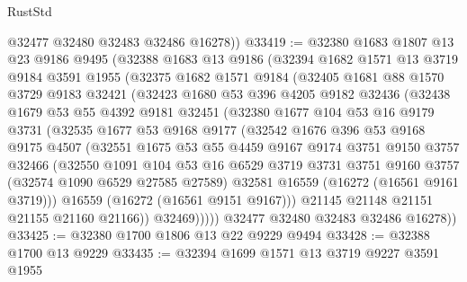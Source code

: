 \begin{lexlean}{RustStd}
\begin{coremodule}
        @32477
        @32480
        @32483
        @32486
        @16278))
@33419 := @32380
    @1683
    @1807
    @13
    @23
    @9186
    @9495
    (@32388
      @1683
      @13
      @9186
      (@32394
        @1682
        @1571
        @13
        @3719
        @9184
        @3591
        @1955
        (@32375
          @1682
          @1571
          @9184
          (@32405
            @1681
            @88
            @1570
            @3729
            @9183
            @32421
            (@32423
              @1680
              @53
              @396
              @4205
              @9182
              @32436
              (@32438
                @1679
                @53
                @55
                @4392
                @9181
                @32451
                (@32380
                  @1677
                  @104
                  @53
                  @16
                  @9179
                  @3731
                  (@32535
                    @1677
                    @53
                    @9168
                    @9177
                    (@32542
                      @1676
                      @396
                      @53
                      @9168
                      @9175
                      @4507
                      (@32551
                        @1675
                        @53
                        @55
                        @4459
                        @9167
                        @9174
                        @3751
                        @9150
                        @3757
                        @32466
                        (@32550
                          @1091
                          @104
                          @53
                          @16
                          @6529
                          @3719
                          @3731
                          @3751
                          @9160
                          @3757
                          (@32574 @1090 @6529 @27585 @27589)
                          @32581
                          @16559
                          (@16272 (@16561 @9161 @3719)))
                        @16559
                        (@16272 (@16561 @9151 @9167)))
                      @21145
                      @21148
                      @21151
                      @21155
                      @21160
                      @21166))
                  @32469)))))
        @32477
        @32480
        @32483
        @32486
        @16278))
@33425 := @32380 @1700 @1806 @13 @22 @9229 @9494
@33428 := @32388 @1700 @13 @9229
@33435 := @32394 @1699 @1571 @13 @3719 @9227 @3591 @1955

\end{coremodule}
\end{lexlean}
